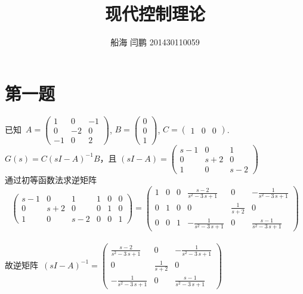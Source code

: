 \documentclass{article}
\begin{document}
\title{现代控制理论}
\author{船海 闫鹏 201430110059}
\date{}
\maketitle
\noindent
\section*{第一题}
\mbox{已知 }$ A=\left(\begin{array}{ccc} 1 & 0 & -1\\ 0 & -2 & 0\\ -1 & 0 & 2 \end{array}\right) $,
$ B=\left(\begin{array}{c} 0\\ 0\\ 1 \end{array}\right) $,  $ C=\left(\begin{array}{ccc} 1 & 0 & 0 \end{array}\right)$. \\
$ G(s)=C(sI-A)^{-1}B $，\mbox{且}
$ (sI-A)=\left(\begin{array}{ccc} s - 1 & 0 & 1\\ 0 & s + 2 & 0\\ 1 & 0 & s - 2 \end{array}\right) $ \\
\mbox{通过初等函数法求逆矩阵} \\
\begin{displaymath}
\left(\begin{array}{cccccc} s - 1 & 0 & 1 & 1 & 0 & 0\\ 0 & s + 2 & 0 & 0 & 1 & 0\\ 1 & 0 & s - 2 & 0 & 0 & 1 \end{array}\right) = \left(\begin{array}{cccccc} 1 & 0 & 0 & \frac{s - 2}{s^2 - 3\, s + 1} & 0 & -\frac{1}{s^2 - 3\, s + 1}\\ 0 & 1 & 0 & 0 & \frac{1}{s + 2} & 0\\ 0 & 0 & 1 & -\frac{1}{s^2 - 3\, s + 1} & 0 & \frac{s - 1}{s^2 - 3\, s + 1} \end{array}\right)
\end{displaymath} \\
\mbox{故逆矩阵 }$(sI-A)^{-1}= \left(\begin{array}{ccc} \frac{s - 2}{s^2 - 3\, s + 1} & 0 & -\frac{1}{s^2 - 3\, s + 1}\\ 0 & \frac{1}{s + 2} & 0\\ -\frac{1}{s^2 - 3\, s + 1} & 0 & \frac{s - 1}{s^2 - 3\, s + 1} \end{array}\right) $ \\
\end{document}
